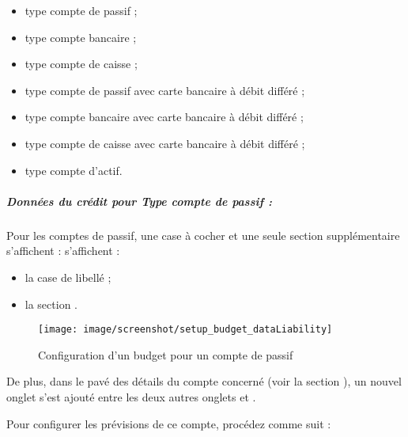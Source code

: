 \begin{itemize}
	\item type compte de passif ;
	\item type compte bancaire ;
	\item type compte de caisse ;		
	\item type compte de passif avec carte bancaire à débit différé ;	
	\item type compte bancaire avec carte bancaire à débit différé ;
	\item type compte de caisse avec carte bancaire à débit différé ;
	\item type compte d'actif.	
\end{itemize}		


\subparagraph{Données du crédit pour Type compte de passif :\label{setup-budget-data-liability}}

Pour les comptes de passif, une case à cocher et une seule section supplémentaire \ifIllustration s'affichent :
\else s'affichent :
\fi

\begin{itemize}
	\item la case de libellé  ; 
	\item la section .
\end{itemize}

\ifIllustration
\begin{figure}[ht]
\begin{center}
\texttt{[image: image/screenshot/setup\_budget\_dataLiability]}
\end{center}
\caption{Configuration d'un budget pour un compte de passif}
\label{setup_budget_dataLiability-img}
\end{figure}
\fi

De plus, dans le pavé des détails du compte concerné (voir la section     ), un nouvel onglet  s'est ajouté entre les deux autres onglets  et .

Pour configurer les prévisions de ce compte, procédez comme suit :

